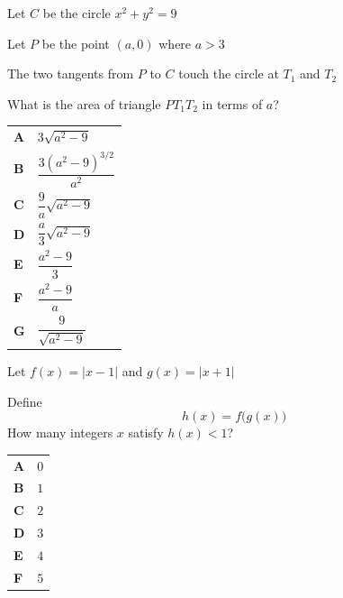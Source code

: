 \documentclass[11pt,a4paper]{article}
\begin{document}
\clearpage
\thispagestyle{djspaper}
\vspace*{8pt}
\begin{enumerate}[label=\textbf{\arabic*.},leftmargin=*,itemsep=0pt,start=13]
\questionitem[Geometry]
Let $C$ be the circle $x^2+y^2=9$

Let $P$ be the point $(a,0)$ where $a>3$

The two tangents from $P$ to $C$ touch the circle at $T_1$ and $T_2$

What is the area of triangle $PT_1T_2$ in terms of $a$?

\par\vspace*{12pt}
\begin{tabularx}{\linewidth}{@{}>{\bfseries}l Y@{}}
A &
$3\sqrt{a^2-9}$
\\[0.8em]
B &
$\dfrac{3(a^2-9)^{3/2}}{a^2}$
\\[0.8em]
C &
$\dfrac{9}{a}\sqrt{a^2-9}$
\\[0.8em]
D &
$\dfrac{a}{3}\sqrt{a^2-9}$
\\[0.8em]
E &
$\dfrac{a^2-9}{3}$
\\[0.8em]
F &
$\dfrac{a^2-9}{a}$
\\[0.8em]
G &
$\dfrac{9}{\sqrt{a^2-9}}$
\\
\end{tabularx}
\end{enumerate}
\clearpage
\thispagestyle{djspaper}
\vspace*{8pt}
\begin{enumerate}[label=\textbf{\arabic*.},leftmargin=*,itemsep=0pt,start=14]
Let $f(x)=|x-1|$ and $g(x)=|x+1|$

Define \[ h(x)=f\bigl(g(x)\bigr) \] How many integers $x$ satisfy $h(x)<1$?

\par\vspace*{12pt}
\begin{tabularx}{\linewidth}{@{}>{\bfseries}l Y@{}}
A &
$0$
\\[0.8em]
B &
$1$
\\[0.8em]
C &
$2$
\\[0.8em]
D &
$3$
\\[0.8em]
E &
$4$
\\[0.8em]
F &
$5$
\\
\end{tabularx}
\end{enumerate}
\end{document}
